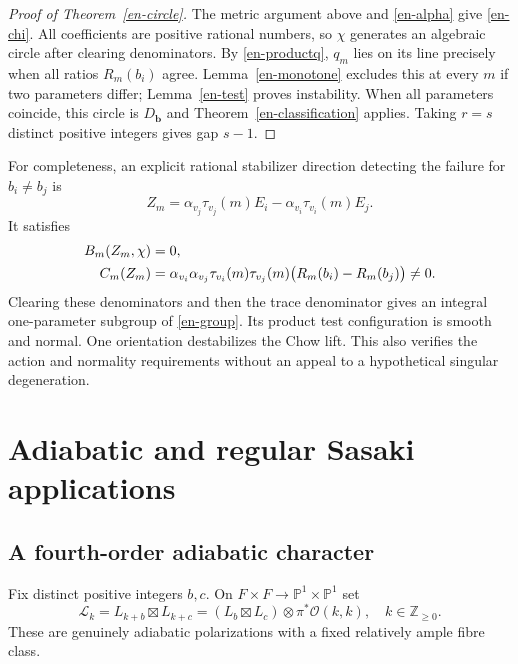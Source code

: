 \documentclass[12pt]{amsart}
\theoremstyle{definition}
\theoremstyle{remark}
\numberwithin{equation}{section}
\newcommand{\cO}{\mathcal{O}}
\newcommand{\Z}{\mathbb{Z}}
\newcommand{\mP}{\mathbb{P}}
\begin{document}
\begin{proof}[Proof of Theorem~\ref{en-circle}]
The metric argument above and \eqref{en-alpha} give \eqref{en-chi}. All coefficients are positive rational numbers, so $\chi$ generates an algebraic circle after clearing denominators. By \eqref{en-productq}, $q_m$ lies on its line precisely when all ratios $R_m(b_i)$ agree. Lemma~\ref{en-monotone} excludes this at every $m$ if two parameters differ; Lemma~\ref{en-test} proves instability. When all parameters coincide, this circle is $D_{\boldsymbol b}$ and Theorem~\ref{en-classification} applies. Taking $r=s$ distinct positive integers gives gap $s-1$.
\end{proof}

For completeness, an explicit rational stabilizer direction detecting the failure for $b_i\ne b_j$ is
\begin{equation}\label{en-Z}
 Z_m=\alpha_{v_j}\tau_{v_j}(m)E_i-
       \alpha_{v_i}\tau_{v_i}(m)E_j .
\end{equation}
It satisfies
\begin{align}\label{en-obstruction}
 B_m(Z_m,\chi)&=0,\\
 C_m(Z_m)&=\alpha_{v_i}\alpha_{v_j}
 \tau_{v_i}(m)\tau_{v_j}(m)
 \bigl(R_m(b_i)-R_m(b_j)\bigr)\ne0.\notag
\end{align}
Clearing these denominators and then the trace denominator gives an integral one-parameter subgroup of \eqref{en-group}. Its product test configuration is smooth and normal. One orientation destabilizes the Chow lift. This also verifies the action and normality requirements without an appeal to a hypothetical singular degeneration.

\section{Adiabatic and regular Sasaki applications}

\subsection{A fourth-order adiabatic character}
Fix distinct positive integers $b,c$. On $F\times F\to\mP^1\times\mP^1$ set
\begin{equation}\label{en-adiabatic}
 \mathcal L_k=L_{k+b}\boxtimes L_{k+c}
 =(L_b\boxtimes L_c)\otimes\pi^*\cO(k,k),\quad k\in\Z_{\geq0}.
\end{equation}
These are genuinely adiabatic polarizations with a fixed relatively ample fibre class.
\end{document}
